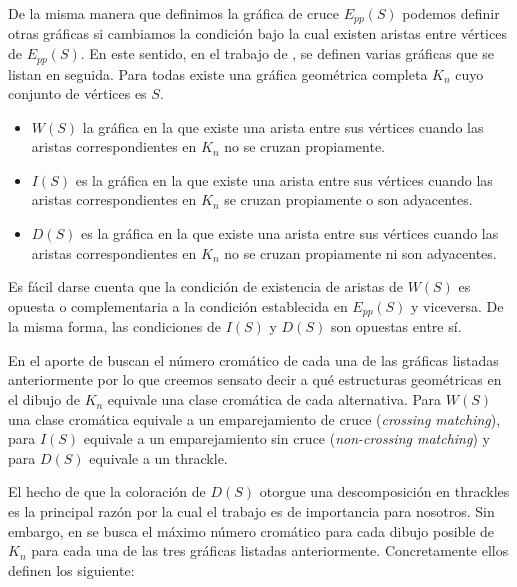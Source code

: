 De la misma manera que definimos la gráfica de cruce $E_{pp}(S)$ podemos definir
otras gráficas si cambiamos la condición bajo la cual existen aristas entre vértices
de $E_{pp}(S)$. En este sentido, en el trabajo de \cite{Araujo2005}, se definen
varias gráficas que se listan en seguida. Para todas existe una gráfica geométrica
completa $K_n$ cuyo conjunto de vértices es $S$.
\begin{itemize}
  \item $W(S)$ la gráfica en la que existe una arista entre sus vértices
  cuando las aristas correspondientes en $K_n$ no se cruzan propiamente.
  \item $I(S)$ es la gráfica en la que existe una arista entre sus vértices
  cuando las aristas correspondientes en $K_n$ se cruzan propiamente o son adyacentes.
  \item $D(S)$ es la gráfica en la que existe una arista entre sus vértices
  cuando las aristas correspondientes en $K_n$ no se cruzan propiamente ni son adyacentes.
\end{itemize}

Es fácil darse cuenta que la condición de existencia de aristas de $W(S)$ es opuesta
o complementaria a la condición establecida en $E_{pp}(S)$ y viceversa. De la misma
forma, las condiciones de $I(S)$ y $D(S)$ son opuestas entre sí.

En el aporte de \cite{Araujo2005} buscan el número cromático de cada una de las
gráficas listadas anteriormente por lo que creemos sensato decir a qué estructuras
geométricas en el dibujo de $K_n$ equivale una clase cromática de cada alternativa.
Para $W(S)$ una clase cromática equivale a un emparejamiento de cruce (\emph{crossing matching}),
para $I(S)$ equivale a un emparejamiento sin cruce (\emph{non-crossing matching})
y para $D(S)$ equivale a un thrackle.

El hecho de que la coloración de $D(S)$ otorgue una descomposición en thrackles es la
principal razón por la cual el trabajo es de importancia para nosotros. Sin embargo,
en \cite{Araujo2005} se busca el máximo número cromático para cada dibujo posible
de $K_n$ para cada una de las tres gráficas listadas anteriormente. Concretamente
ellos definen los siguiente:

